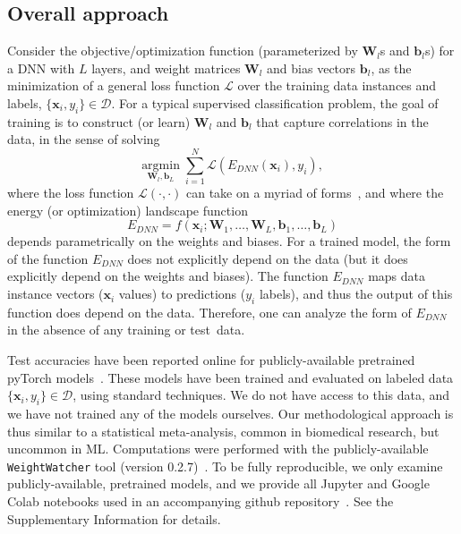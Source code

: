 \subsection{Overall approach}
\label{sxn:approach}


Consider the objective/optimization function (parameterized by $\mathbf{W}_{l}$s and $\mathbf{b}_{l}$s) for a DNN with $L$ layers, and weight matrices $\mathbf{W}_{l}$ and bias vectors $\mathbf{b}_{l}$, as 
the minimization of a general loss function $\mathcal{L}$ over the training data instances and labels, $\{\mathbf{x}_{i},y_{i}\}\in\mathcal{D}$.
For a typical supervised classification problem, the goal of training is to construct (or learn) $\mathbf{W}_{l}$ and $\mathbf{b}_{l}$ that capture correlations in the data, in the sense of solving
\begin{equation}
\underset{\mathbf{W}_{l},\mathbf{b}_{L}}{\text{argmin}}\;\sum_{i=1}^{N} \mathcal{L}(E_{DNN}(\mathbf{x}_{i}),y_{i})   ,
\end{equation}
where the loss function $\mathcal{L}(\cdot,\cdot)$ can take on a myriad of forms~\cite{JC17_TR}, and where the energy (or optimization) landscape function
\begin{equation}
E_{DNN} = f(\mathbf{x}_{i} ; \mathbf{W}_{1},\ldots,\mathbf{W}_{L},\mathbf{b}_{1},\ldots,\mathbf{b}_{L})
\label{eqn:dnn_energy}
\end{equation}
depends parametrically on the weights and biases.
For a trained model, the form of the function $E_{DNN}$ does not explicitly depend on the data (but it does explicitly depend on the weights and biases).
The function $E_{DNN}$ maps data instance vectors ($\mathbf{x}_i$ values) to predictions ($y_{i}$ labels), and thus the output of this function does depend on the data.
Therefore, one can analyze the form of $E_{DNN}$ in the absence of any training or test~data. 

Test accuracies have been reported online for publicly-available pretrained pyTorch models~\cite{osmr}.
These models have been trained and evaluated on labeled data $\{\mathbf{x}_{i},y_{i}\}\in\mathcal{D}$, using standard techniques.  
We do not have access to this data, and we have not trained any of the models ourselves. 
Our methodological approach is thus similar to a statistical meta-analysis, common in biomedical research, but uncommon in ML.
%
Computations were performed with the publicly-available \texttt{WeightWatcher} tool (version 0.2.7)~\cite{weightwatcher_package}.
To be fully reproducible, we only examine publicly-available, pretrained models, and we provide all Jupyter and Google Colab notebooks used in an accompanying github repository~\cite{kdd20_sub_repo}.
See the Supplementary Information
for details.



